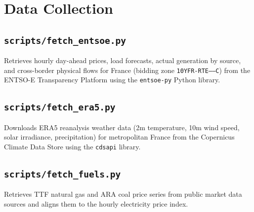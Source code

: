 \documentclass[11pt, a4paper, oneside]{report}
\begin{document}
\clearpage

\chapter{Data Collection}

\section{\texttt{scripts/fetch\_entsoe.py}}

Retrieves hourly day-ahead prices, load forecasts, actual generation by source,
and cross-border physical flows for France (bidding zone
\texttt{10YFR-RTE------C}) from the ENTSO-E Transparency Platform using the
\texttt{entsoe-py} Python library.



\clearpage

\section{\texttt{scripts/fetch\_era5.py}}

Downloads ERA5 reanalysis weather data (2m temperature, 10m wind speed,
solar irradiance, precipitation) for metropolitan France from the Copernicus
Climate Data Store using the \texttt{cdsapi} library.



\clearpage

\section{\texttt{scripts/fetch\_fuels.py}}

Retrieves TTF natural gas and ARA coal price series from public market data
sources and aligns them to the hourly electricity price index.



\clearpage

\end{document}
